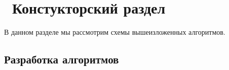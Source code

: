 \chapter{ Констукторский раздел}
\label{cha:design}

В данном разделе мы рассмотрим схемы вышеизложенных алгоритмов.

\section{Разработка алгоритмов}

\begin{figure}[ht!]
\end{figure}


\begin{figure}[ht!]
\end{figure}

